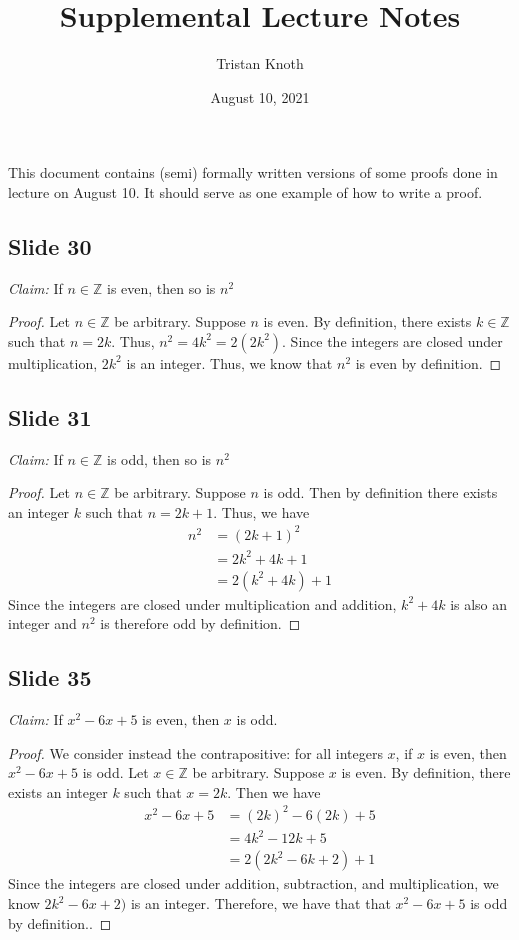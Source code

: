\documentclass[12pt]{article}
\title{Supplemental Lecture Notes}
\date{August 10, 2021}
\author{Tristan Knoth}
\begin{document}
\maketitle

This document contains (semi) formally written versions of some proofs done in lecture
on August 10.
It should serve as one example of how to write a proof.

\subsection*{Slide 30}

\textit{Claim:} If $n \in \mathbb{Z}$ is even, then so is $n^2$
\begin{proof}
Let $n \in \mathbb{Z}$ be arbitrary.
Suppose $n$ is even.
By definition, there exists $k \in \mathbb{Z}$ such that
$n = 2k$.
Thus, $n^2 = 4k^2 = 2(2k^2)$.
Since the integers are closed under multiplication, $2k^2$ is an integer.
Thus, we know that $n^2$ is even by definition.
\end{proof}

\subsection*{Slide 31}

\textit{Claim:} If $n \in \mathbb{Z}$ is odd, then so is $n^2$
\begin{proof}
Let $n \in \mathbb{Z}$ be arbitrary.
Suppose $n$ is odd. 
Then by definition there exists an integer $k$ such that $n = 2k + 1$.
Thus, we have 
\begin{align*}
  n^2 &= (2k + 1)^2 \\
  &= 2k^2 + 4k + 1 \\
  &= 2(k^2 + 4k) + 1
\end{align*}
Since the integers are closed under multiplication and addition,
$k^2 + 4k$ is also an integer and $n^2$ is therefore odd by definition.
\end{proof}

\subsection*{Slide 35}

\textit{Claim:} If $x^2 - 6x + 5$ is even, then $x$ is odd.
\begin{proof}
We consider instead the contrapositive: for all integers $x$, if $x$ is even,
then $x^2 - 6x + 5$ is odd.
Let $x \in \mathbb{Z}$ be arbitrary.
Suppose $x$ is even.
By definition, there exists an integer $k$ such that $x = 2k$.
Then we have
  \begin{align*}
    x^2 - 6x + 5 &= (2k)^2 - 6(2k) + 5 \\
    &= 4k^2 - 12k + 5 \\
    &= 2(2k^2 - 6k + 2) + 1
  \end{align*}
Since the integers are closed under addition, subtraction, and multiplication,
we know $2k^2 - 6x + 2)$ is an integer.
Therefore, we have that that
$x^2 - 6x + 5$ is odd by definition..
\end{proof}
\end{document}
